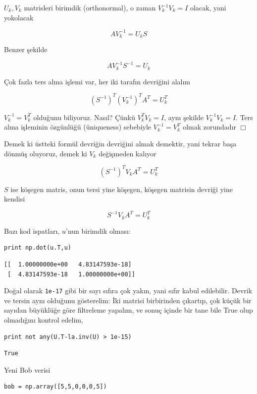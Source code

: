 \documentclass[12pt,fleqn]{article}\usepackage{../../common}
\begin{document}
$U_k,V_k$ matrisleri birimdik (orthonormal), o zaman $V_k^{-1}V_k = I$
olacak, yani yokolacak

$$ A V_k^{-1} = U_k S  $$

Benzer şekilde

$$  A V_k^{-1} S^{-1} = U_k $$

Çok fazla ters alma işlemi var, her iki tarafın devriğini alalım

$$ (S^{-1})^T (V_k^{-1})^T A^T = U_k^T $$

$V_k^{-1} = V_k^T$ olduğunu biliyoruz. Nasıl? Çünkü $ V_k^TV_k = I $, aynı
şekilde $ V_k^{-1}V_k = I $. Ters alma işleminin özgünlüğü (üniqueness)
sebebiyle $V_k^{-1} = V_k^T$ olmak zorundadır $\Box$

Demek ki üstteki formül devriğin devriğini almak demektir, yani tekrar başa
dönmüş oluyoruz, demek ki $V_k$ değişmeden kalıyor

$$ (S^{-1})^T V_k A^T = U_k^T $$

$S$ ise köşegen matris, onun tersi yine köşegen, köşegen matrisin devriği
yine kendisi

$$ S^{-1} V_k A^T = U_k^T $$

Bazı kod ispatları, $u$'nun birimdik olması:

\begin{verbatim}
print np.dot(u.T,u)
\end{verbatim}

\begin{verbatim}
[[  1.00000000e+00   4.83147593e-18]
 [  4.83147593e-18   1.00000000e+00]]
\end{verbatim}

Doğal olarak \verb!1e-17! gibi bir sayı sıfıra çok yakın, yani sıfır kabul
edilebilir. Devrik ve tersin aynı olduğunu gösterelim: İki matrisi birbirinden
çıkartıp, çok küçük bir sayıdan büyüklüğe göre filtreleme yapalım, ve sonuç
içinde bir tane bile True olup olmadığını kontrol edelim,

\begin{verbatim}
print not any(U.T-la.inv(U) > 1e-15)
\end{verbatim}

\begin{verbatim}
True
\end{verbatim}

Yeni Bob verisi 

\begin{verbatim}
bob = np.array([5,5,0,0,0,5]) 
\end{verbatim}
\end{document}
